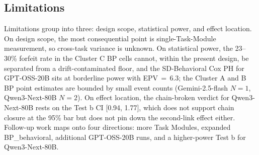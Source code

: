 \subsection{Limitations}\label{sec:limits}
Limitations group into three: design scope, statistical power, and effect location. On design scope, the most consequential point is single-Task-Module measurement, so cross-task variance is unknown. On statistical power, the 23--30\% forfeit rate in the Cluster C BP cells cannot, within the present design, be separated from a drift-contaminated floor, and the SD-Behavioral Cox PH for GPT-OSS-20B sits at borderline power with EPV\,\(=\)\,6.3; the Cluster A and B BP point estimates are bounded by small event counts (Gemini-2.5-flash \(N=1\), Qwen3-Next-80B \(N=2\)). On effect location, the chain-broken verdict for Qwen3-Next-80B rests on the Test b CI [0.94, 1.77], which does not support chain closure at the 95\% bar but does not pin down the second-link effect either. Follow-up work maps onto four directions: more Task Modules, expanded BP\_behavioral, additional GPT-OSS-20B runs, and a higher-power Test b for Qwen3-Next-80B.
